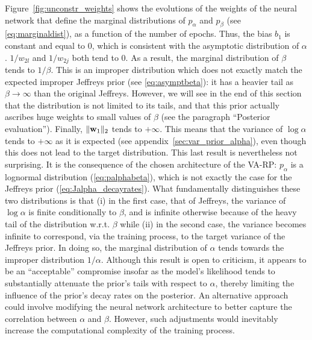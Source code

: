 Figure~\ref{fig:unconstr_weights} shows the evolutions of the weights of the neural network that define the marginal distributions of $p_\alpha$ and $p_\beta$ (see \cref{eq:marginaldist}), as a function of the number of epochs. Thus, the bias $b_1$ is constant and equal to $0$, which is consistent with the asymptotic distribution of $\alpha$. $1/w_{2l}$ and $1/w_{2j}$ both tend to 0. As a result, the marginal distribution of $\beta$ tends to $1/\beta$. This is an improper distribution which does not exactly match the expected improper Jeffreys prior (see \cref{eq:asymptbeta}): it has a heavier tail as $\beta\to\infty$ than the original Jeffreys. However, we will see in the end of this section that the distribution is not limited to its tails, and that this prior actually ascribes huge weights to small values of $\beta$ (see the paragraph ``Posterior evaluation''). Finally, $\|\mathbf{w}_1\|_2$ tends to $+\infty$. This means that the variance of  $\log\alpha$ tends to $+\infty$ as it is expected (see appendix~\ref{sec:var_prior_alpha}), even though this does not lead to the target distribution. This last result is nevertheless not surprising. It is the consequence of the chosen architecture of the VA-RP: $p_\alpha$ is a lognormal distribution (\cref{eq:palphabeta}), which is not exactly the case for the Jeffreys prior (\cref{eq:Jalpha_decayrates}). What fundamentally distinguishes these two distributions is that (i) in the first case, that of Jeffreys, the variance of $\log\alpha$ is finite conditionally to $\beta$, and is infinite otherwise because of the heavy tail of the distribution w.r.t. $\beta$ %
while (ii) in the second case, the variance becomes infinite to correspond, via the training process, to the target variance of the Jeffreys prior. In doing so, the marginal distribution of $\alpha$ tends towards the improper distribution $1/\alpha$. Although this result is open to criticism, it appears to be an ``acceptable'' compromise insofar as the model's likelihood tends to substantially attenuate the prior's tails with respect to $\alpha$, thereby limiting the influence of the prior's decay rates on the posterior. An alternative approach could involve modifying the neural network architecture to better capture the correlation between $\alpha$ and $\beta$. However, such adjustments would inevitably increase the computational complexity of the training process.


